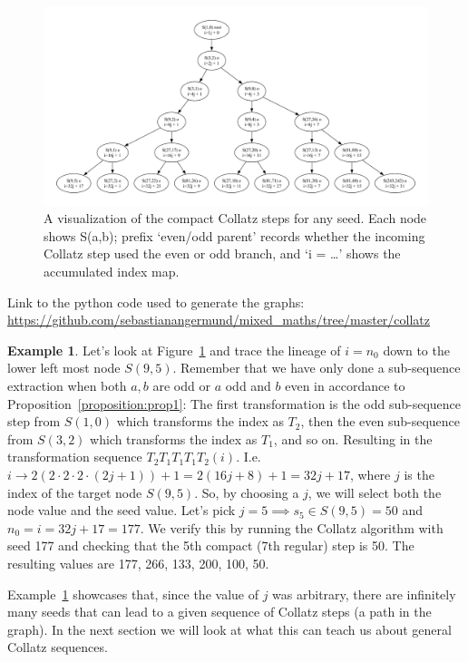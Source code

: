 \documentclass{article}
\theoremstyle{definition}
\newtheorem{example}{Example}[section]
\begin{document}
\begin{figure}[H]
\begin{center} 
\includegraphics[width=1.0\textwidth]{tree.pdf}
\caption{A visualization of the compact Collatz steps for any seed. Each node shows S(a,b); prefix ‘even/odd parent’ records whether the incoming Collatz step used the even or odd branch, and ‘i = …’ shows the accumulated index map.}
\label{fig:fig2}
\end{center}
\end{figure}
%
Link to the python code used to generate the graphs: \url{https://github.com/sebastianangermund/mixed_maths/tree/master/collatz}
%
\begin{example}\label{example:ex2}
Let's look at Figure~\ref{fig:fig2} and trace the lineage of $i=n_0$ down to the lower left most node $S(9,5)$. Remember that we have only done a sub-sequence extraction when both $a,b$ are odd or $a$ odd and $b$ even in accordance to Proposition~\ref{proposition:prop1}:
The first transformation is the odd sub-sequence step from $S(1,0)$ which transforms the index as $T_2$, then the even sub-sequence from $S(3,2)$ which transforms the index as $T_1$, and so on. Resulting in the transformation sequence $T_2T_1T_1T_1T_2(i)$. I.e. $i \longrightarrow 2(2\cdot2\cdot2\cdot(2j+1))+1 = 2(16j+8)+1 = 32j+17$, where $j$ is the index of the target node $S(9,5)$.
So, by choosing a $j$, we will select both the node value and the seed value. Let's pick $j=5 \implies s_5\in S(9,5) = 50$ and $n_0 = i = 32j+17 = 177$. We verify this by running the Collatz algorithm with seed 177 and checking that the 5th compact (7th regular) step is 50. The resulting values are 177, 266, 133, 200, 100, 50.
\end{example}
%
Example~\ref{example:ex2} showcases that, since the value of $j$ was arbitrary, there are infinitely many seeds that can lead to a given sequence of Collatz steps (a path in the graph). In the next section we will look at what this can teach us about general Collatz sequences.
\end{document}
